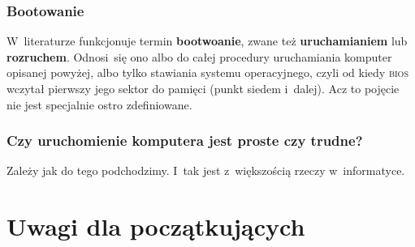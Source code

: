 \documentclass[10pt,t]{beamer}
\begin{document}
\begin{frame}
  \frametitle{Bootowanie}


  W~literaturze funkcjonuje termin \textbf{bootwoanie}, zwane też
  \textbf{uruchamianiem} lub \textbf{rozruchem}. Odnosi~się ono albo do
  całej procedury uruchamiania komputer opisanej powyżej, albo tylko
  stawiania systemu operacyjnego, czyli od kiedy \textsc{bios} wczytał
  pierwszy jego sektor do pamięci (punkt siedem i~dalej). Acz to pojęcie
  nie jest specjalnie ostro zdefiniowane.

\end{frame}





\begin{frame}
  \frametitle{Czy uruchomienie komputera jest proste czy trudne?}


  Zależy jak do tego podchodzimy. I~tak jest z~większością rzeczy
  w~informatyce.

\end{frame}

















\section{Uwagi dla początkujących}
\end{document}
